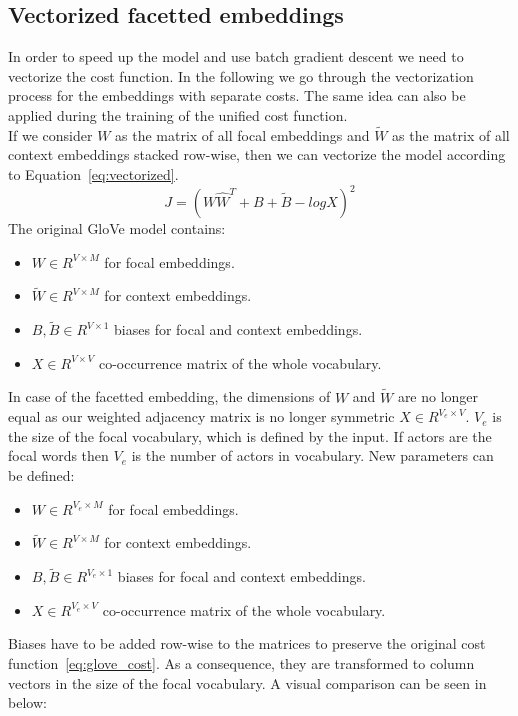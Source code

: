 \subsection{Vectorized facetted embeddings}
In order to speed up the model and use batch gradient descent we need to vectorize the cost function. In the following we go through the vectorization process for the embeddings with separate costs. The same idea can also be applied during the training of the unified cost function.\\
If we consider $W$ as the matrix of all focal embeddings and $\tilde{ W } $ as the matrix of all context embeddings stacked row-wise, then we can vectorize the model according to Equation~\ref{eq:vectorized}. 
\begin{equation}
J=(W \hat{  W }^{ T } +B+\tilde{ B } -log{ X })^{ 2 }
\label{eq:vectorized}
\end{equation}
The original GloVe model contains:
\begin{itemize}
\item $W \in R^{V \times M} $ for focal embeddings.
 \item $\tilde{ W }  \in R^{V \times M} $ for context embeddings.
\item $B,\tilde{B} \in R^{V \times 1}$ biases for focal and context embeddings. 
\item $X \in R^{V\times V} $ co-occurrence matrix of the whole vocabulary. 
\end{itemize}
In case of the facetted embedding, the dimensions of  $W$ and $\tilde{ W } $ are no longer equal as our weighted adjacency matrix is no longer symmetric $X \in R^{V_e\times V} $.  $V_e$ is the size of the focal vocabulary, which is defined by the input. If actors are the focal words then $V_e$ is the number of actors in vocabulary. New parameters can be defined: 
\begin{itemize}
\item $W \in R^{V_e \times M} $ for focal embeddings.
 \item $\tilde{ W }  \in R^{V \times M} $ for context embeddings.
\item $B,\tilde{B} \in R^{V_e \times 1}$ biases for focal and context embeddings.
\item $X \in R^{V_e\times V} $ co-occurrence matrix of the whole vocabulary. 
\end{itemize}
Biases have to be added row-wise to the matrices to preserve the original cost function~\ref{eq:glove_cost}. As a consequence, they are transformed to column vectors in the size of the focal vocabulary. A visual comparison can be seen in below:\\
